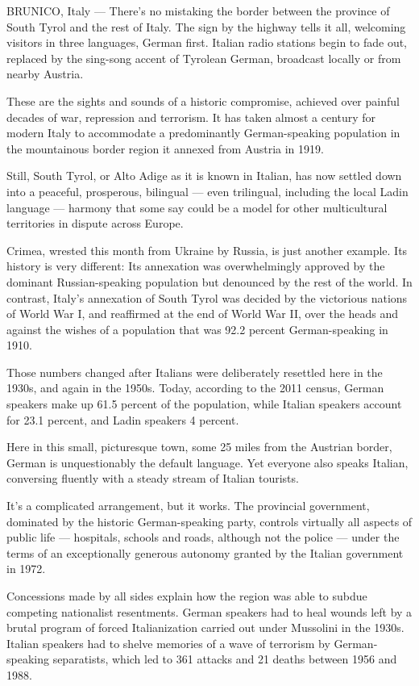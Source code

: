 BRUNICO, Italy --- There's no mistaking the border between the province
of South Tyrol and the rest of Italy. The sign by the highway tells it
all, welcoming visitors in three languages, German first. Italian radio
stations begin to fade out, replaced by the sing-song accent of Tyrolean
German, broadcast locally or from nearby Austria.

These are the sights and sounds of a historic compromise, achieved over
painful decades of war, repression and terrorism. It has taken almost a
century for modern Italy to accommodate a predominantly German-speaking
population in the mountainous border region it annexed from Austria in
1919.

Still, South Tyrol, or Alto Adige as it is known in Italian, has now
settled down into a peaceful, prosperous, bilingual --- even trilingual,
including the local Ladin language --- harmony that some say could be a
model for other multicultural territories in dispute across Europe.

Crimea, wrested this month from Ukraine by Russia, is just another
example. Its history is very different: Its annexation was
overwhelmingly approved by the dominant Russian-speaking population but
denounced by the rest of the world. In contrast, Italy's annexation of
South Tyrol was decided by the victorious nations of World War I, and
reaffirmed at the end of World War II, over the heads and against the
wishes of a population that was 92.2 percent German-speaking in 1910.

Those numbers changed after Italians were deliberately resettled here in
the 1930s, and again in the 1950s. Today, according to the 2011 census,
German speakers make up 61.5 percent of the population, while Italian
speakers account for 23.1 percent, and Ladin speakers 4 percent.

Here in this small, picturesque town, some 25 miles from the Austrian
border, German is unquestionably the default language. Yet everyone also
speaks Italian, conversing fluently with a steady stream of Italian
tourists.

It's a complicated arrangement, but it works. The provincial government,
dominated by the historic German-speaking party, controls virtually all
aspects of public life --- hospitals, schools and roads, although not
the police --- under the terms of an exceptionally generous autonomy
granted by the Italian government in 1972.

Concessions made by all sides explain how the region was able to subdue
competing nationalist resentments. German speakers had to heal wounds
left by a brutal program of forced Italianization carried out under
Mussolini in the 1930s. Italian speakers had to shelve memories of a
wave of terrorism by German-speaking separatists, which led to 361
attacks and 21 deaths between 1956 and 1988.


